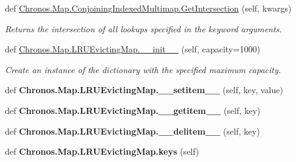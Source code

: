 \begin{DoxyCompactItemize}
\item 
def \hyperlink{group__PyInfrastructure_gaf6acad2c10b1208a8f9a5f2d85de1865}{Chronos.\+Map.\+Conjoining\+Indexed\+Multimap.\+Get\+Intersection} (self, kwargs)
\begin{DoxyCompactList}\small\item\em Returns the intersection of all lookups specified in the keyword arguments. \end{DoxyCompactList}\item 
def \hyperlink{group__PyInfrastructure_ga792e630c1a4c608f22ccbc4f784b710e}{Chronos.\+Map.\+L\+R\+U\+Evicting\+Map.\+\_\+\+\_\+init\+\_\+\+\_\+} (self, capacity=1000)
\begin{DoxyCompactList}\small\item\em Create an instance of the dictionary with the specified maximum capacity. \end{DoxyCompactList}\item 
def {\bfseries Chronos.\+Map.\+L\+R\+U\+Evicting\+Map.\+\_\+\+\_\+setitem\+\_\+\+\_\+} (self, key, value)\hypertarget{group__PyInfrastructure_ga203c431d41a56ae5ab1aa6f310bedfa3}{}\label{group__PyInfrastructure_ga203c431d41a56ae5ab1aa6f310bedfa3}

\item 
def {\bfseries Chronos.\+Map.\+L\+R\+U\+Evicting\+Map.\+\_\+\+\_\+getitem\+\_\+\+\_\+} (self, key)\hypertarget{group__PyInfrastructure_gad19253ff484c623062819eead33bace8}{}\label{group__PyInfrastructure_gad19253ff484c623062819eead33bace8}

\item 
def {\bfseries Chronos.\+Map.\+L\+R\+U\+Evicting\+Map.\+\_\+\+\_\+delitem\+\_\+\+\_\+} (self, key)\hypertarget{group__PyInfrastructure_ga65fd86a109a102fab9b04c81f1041c0a}{}\label{group__PyInfrastructure_ga65fd86a109a102fab9b04c81f1041c0a}

\item 
def {\bfseries Chronos.\+Map.\+L\+R\+U\+Evicting\+Map.\+keys} (self)\hypertarget{group__PyInfrastructure_ga3e6ebc3dcbc940b7d0d5780af35faf94}{}\label{group__PyInfrastructure_ga3e6ebc3dcbc940b7d0d5780af35faf94}

\end{DoxyCompactItemize}
